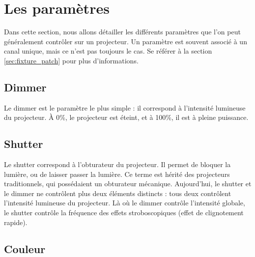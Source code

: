 \section{Les paramètres}
\label{sec:paramètres}

Dans cette section, nous allons détailler les différents paramètres que l'on peut généralement contrôler sur un projecteur.
Un paramètre est souvent associé à un canal unique, mais ce n'est pas toujours le cas. Se référer à la section \ref{sec:fixture_patch} pour plus d'informations.

\subsection{Dimmer}
\label{subsec:param_dimmer}

Le dimmer est le paramètre le plus simple : il correspond à l'intensité lumineuse du projecteur. À 0\%, le projecteur est éteint, et à 100\%, il est à pleine puissance.

\subsection{Shutter}
\label{subsec:param_shutter}

Le shutter correspond à l'obturateur du projecteur. Il permet de bloquer la lumière, ou de laisser passer la lumière. Ce terme est hérité des projecteurs traditionnels, qui possédaient un obturateur mécanique.
Aujourd'hui, le shutter et le dimmer ne contrôlent plus deux éléments distincts : tous deux contrôlent l'intensité lumineuse du projecteur. Là où le dimmer contrôle l'intensité globale, le shutter contrôle la fréquence des effets stroboscopiques (effet de clignotement rapide).

\subsection{Couleur}
\label{subsec:param_couleur}


